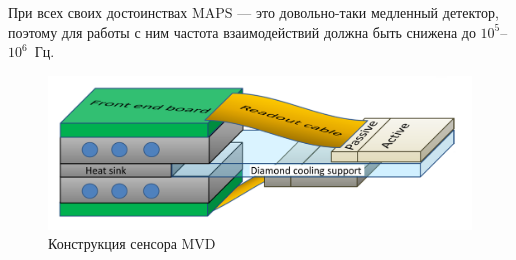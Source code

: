 При всех своих достоинствах MAPS --- это довольно-таки медленный детектор, поэтому для работы с ним частота взаимодействий должна быть снижена до $10^5$--$10^6$~Гц.



\begin{figure}[H]
\centering
\includegraphics[width=1.0\textwidth]{pictures/MVD_3.png}
\caption{Конструкция сенсора MVD }
\label{fig:MVD23}
\end{figure}

